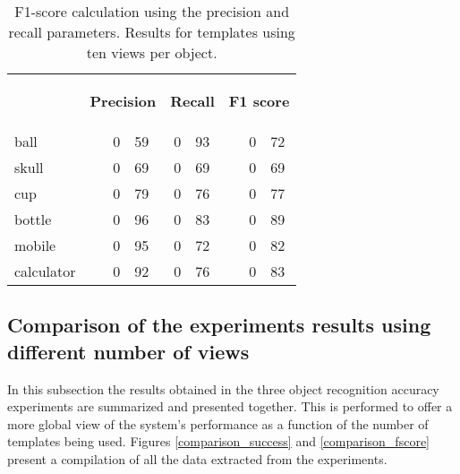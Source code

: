 \begin{table}[H]
\centering
\begin{tabular} {l l r@{.}l r@{.}l l r@{.}l }
\toprule
\addlinespace[3mm]
   \multicolumn{1}{c}{\begin{center}\textbf{Object}\end{center}} &
   \multicolumn{3}{c}{\begin{center}\textbf{Precision}\end{center}} &
   \multicolumn{2}{c}{\begin{center}\textbf{Recall}\end{center}} &
   \multicolumn{3}{c}{\begin{center}\hspace*{0.2cm}\textbf{F1 score}\end{center}} &\\
\addlinespace[-3mm]

\midrule
ball		&&	0&59 	&	0&93	&&	0&72	\\
skull		&&	0&69	&	0&69	&&	0&69	\\
cup			&&	0&79	&	0&76	&&	0&77	\\
bottle		&&	0&96	&	0&83	&&	0&89	\\
mobile		&&	0&95	&	0&72	&&	0&82	\\
calculator	&&	0&92	&	0&76	&&	0&83	\\

\bottomrule
\end{tabular}
\caption[F1-score - templates using 10 views]{F1-score calculation using the precision and recall parameters. Results for templates using ten views per object. }
\label{10views_fscore}
\end{table}



	\subsection{Comparison of the experiments results using different number of views}

	In this subsection the results obtained in the three object recognition accuracy experiments are summarized and presented together. 
	This is performed to offer a more global view of the system's performance as a function of the number of templates being used. 
	Figures \ref{comparison_success} and \ref{comparison_fscore} present a compilation of all the data extracted from the experiments. 
	\\



